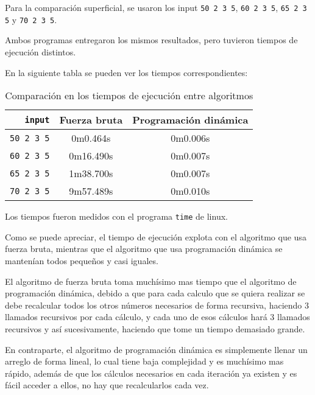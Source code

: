 \documentclass[spanish, fleqn]{article}
\begin{document}
Para la comparación superficial, se usaron los input \texttt{50 2 3 5}, \texttt{60 2 3 5},  \texttt{65 2 3 5} y \texttt{70 2 3 5}. 

Ambos programas entregaron los mismos resultados, pero tuvieron tiempos de ejecución distintos.

En la siguiente tabla se pueden ver los tiempos correspondientes:

\begin{table}

    \centering
    \begin{tabular}{r|c|c}
        \hline
        \texttt{input} & Fuerza bruta & Programación dinámica \\
        \hline
        \texttt{50 2 3 5} & 0m0.464s & 0m0.006s \\
        \texttt{60 2 3 5} & 0m16.490s & 0m0.007s \\
        \texttt{65 2 3 5} & 1m38.700s & 0m0.007s \\
        \texttt{70 2 3 5} & 9m57.489s & 0m0.010s \\
        \hline
    \end{tabular}
    \caption{Comparación en los tiempos de ejecución entre algoritmos}
    
\end{table}

Los tiempos fueron medidos con el programa \texttt{time} de linux.

Como se puede apreciar, el tiempo de ejecución explota con el algoritmo que usa fuerza bruta, mientras que el algoritmo que usa programación dinámica se mantenían todos pequeños y casi iguales.

El algoritmo de fuerza bruta toma muchísimo mas tiempo que el algoritmo de programación dinámica, debido a que para cada calculo que se quiera realizar se debe recalcular todos los otros números necesarios de forma recursiva, haciendo 3 llamados recursivos por cada cálculo, y cada uno de esos cálculos hará 3 llamados recursivos y así sucesivamente, haciendo que tome un tiempo demasiado grande.

En contraparte, el algoritmo de programación dinámica es simplemente llenar un arreglo de forma lineal, lo cual tiene baja complejidad y es muchísimo mas rápido, además de que los cálculos necesarios en cada iteración ya existen y es fácil acceder a ellos, no hay que recalcularlos cada vez.
\end{document}
